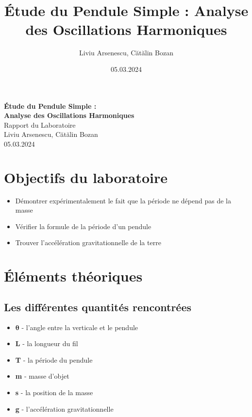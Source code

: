 \documentclass[12pt,a4paper]{article}
\title{Étude du Pendule Simple : Analyse des Oscillations Harmoniques}
\author{Liviu Arsenescu, Cătălin Bozan}
\date{05.03.2024}
\begin{document}
    \begin{titlepage}
        \begin{center}
            \vspace*{\fill}
            \Huge \textbf{Étude du Pendule Simple :} \\
            \Huge \textbf{Analyse des Oscillations Harmoniques} \\
            \Large Rapport du Laboratoire \\
            \vspace{\fill}
            \Large Liviu Arsenescu, Cătălin Bozan \\
            05.03.2024

            \vspace*{\fill}
        \end{center}
    \end{titlepage}

    \tableofcontents

    \newpage

    \section{Objectifs du laboratoire}
    \begin{itemize}
        \item Démontrer expérimentalement le fait que la période ne dépend pas de la masse
        \item Vérifier la formule de la période d'un pendule
        \item Trouver l'accélération gravitationnelle de la terre
    \end{itemize}

    \section{Éléments théoriques}
    \subsection{Les différentes quantités rencontrées}
    \begin{itemize}
        \item $\bm{\theta}$ - l'angle entre la verticale et le pendule
        \item \textbf{L} - la longueur du fil
        \item \textbf{T} - la période du pendule
        \item \textbf{m} - masse d'objet
        \item \textbf{s} - la position de la masse
        \item \textbf{g} - l'accélération gravitationnelle
    \end{itemize}
\end{document}
